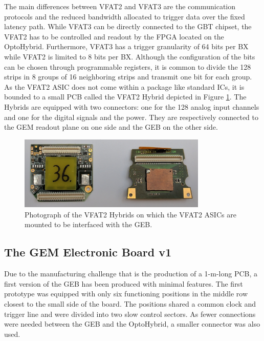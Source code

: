      The main differences between VFAT2 and VFAT3 are the communication protocols and the reduced bandwidth allocated to trigger data over the fixed latency path. While VFAT3 can be directly connected to the GBT chipset, the VFAT2 has to be controlled and readout by the FPGA located on the OptoHybrid. Furthermore, VFAT3 has a trigger granularity of 64 bits per BX while VFAT2 is limited to 8 bits per BX. Although the configuration of the bits can be chosen through programmable registers, it is common to divide the 128 strips in 8 groups of 16 neighboring strips and transmit one bit for each group. \\

      As the VFAT2 ASIC does not come within a package like standard ICs, it is bounded to a small PCB called the VFAT2 Hybrid depicted in Figure \ref{fig:II-2-vfat2-hybrid}. The Hybrids are equipped with two connectors: one for the 128 analog input channels and one for the digital signals and the power. They are respectively connected to the GEM readout plane on one side and the GEB on the other side.

      \begin{figure}[h!]
        \centering
        \includegraphics[width=0.8\textwidth]{img/II-2-daq/vfat2-hybrid.jpg}
        \caption{Photograph of the VFAT2 Hybrids on which the VFAT2 ASICs are mounted to be interfaced with the GEB.}
        \label{fig:II-2-vfat2-hybrid}
      \end{figure}

    \subsection{The GEM Electronic Board v1}

      Due to the manufacturing challenge that is the production of a 1-m-long PCB, a first version of the GEB has been produced with minimal features. The first prototype was equipped with only six functioning positions in the middle row closest to the small side of the board. The positions shared a common clock and trigger line and were divided into two slow control sectors. As fewer connections were needed between the GEB and the OptoHybrid, a smaller connector was also used.

